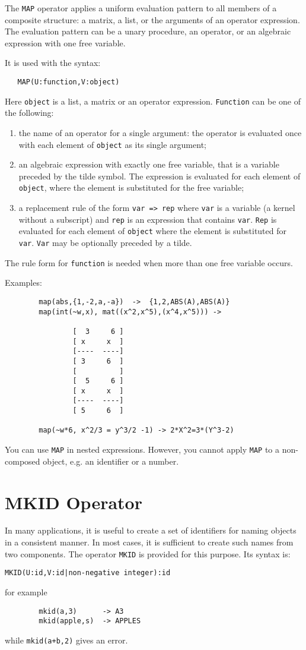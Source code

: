 \documentclass[11pt,letterpaper]{book}
\makeatletter
\newcommand{\underscore}{\_}
\newcommand{\ttindex}[1]{{\renewcommand{\_}{\protect\underscore}%
                          \index{#1@{\tt #1}}}}
\makeatother
\begin{document}
The {\tt MAP} operator applies a uniform evaluation pattern to all members
of a composite structure: a matrix, a list, or the arguments of an
operator expression.  The evaluation pattern can be a unary procedure, an
operator, or an algebraic expression with one free variable.

It is used with the syntax:
{\small\begin{verbatim}
   MAP(U:function,V:object)
\end{verbatim}}
Here {\tt object} is a list, a matrix or an operator expression.
{\tt Function} can be one of the following:
\begin{enumerate}
\item the name of an operator for a single argument: the operator
is evaluated once with each element of {\tt object} as its single argument;
\item an algebraic expression with exactly one free variable, that is
a variable preceded by the tilde symbol. The expression
is evaluated for each element of {\tt object}, where the element is
substituted for the free variable;
\item a replacement rule of the form {\tt var => rep}
where {\tt var} is a variable (a kernel without a subscript)
and {\tt rep} is an expression that contains {\tt var}.
{\tt Rep} is evaluated for each element of {\tt object} where
the element is substituted for  {\tt var}. {\tt Var} may be
optionally preceded by a tilde.
\end{enumerate}
The rule form  for {\tt function} is needed when more than
one free variable occurs.

Examples:
{\small\begin{verbatim}
        map(abs,{1,-2,a,-a})  ->  {1,2,ABS(A),ABS(A)}
        map(int(~w,x), mat((x^2,x^5),(x^4,x^5))) ->

                [  3     6 ]
                [ x     x  ]
                [----  ----]
                [ 3     6  ]
                [          ]
                [  5     6 ]
                [ x     x  ]
                [----  ----]
                [ 5     6  ]

        map(~w*6, x^2/3 = y^3/2 -1) -> 2*X^2=3*(Y^3-2)
\end{verbatim}}

You can use {\tt MAP} in nested expressions. However, you cannot
apply {\tt MAP} to a non-composed object, e.g. an identifier or a number.


\section{MKID Operator}\ttindex{MKID}
In many applications, it is useful to create a set of identifiers for
naming objects in a consistent manner. In most cases, it is sufficient to
create such names from two components. The operator {\tt MKID} is provided
for this purpose. Its syntax is:
{\small\begin{verbatim}
MKID(U:id,V:id|non-negative integer):id
\end{verbatim}}
for example
{\small\begin{verbatim}
        mkid(a,3)      -> A3
        mkid(apple,s)  -> APPLES
\end{verbatim}}
while {\tt mkid(a+b,2)} gives an error.
\end{document}
